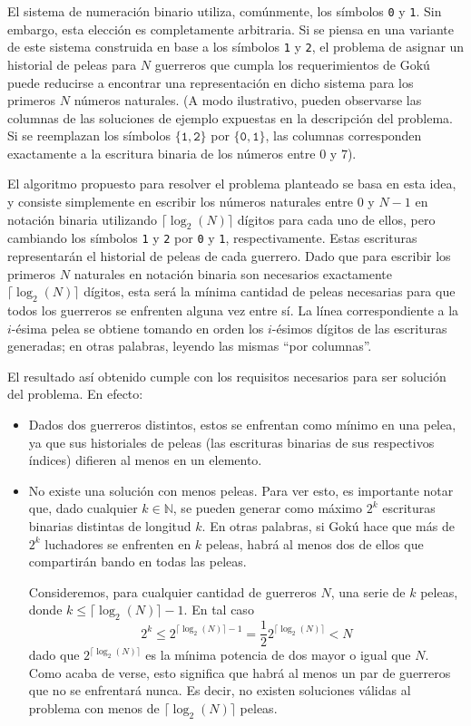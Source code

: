         El sistema de numeración binario utiliza, comúnmente, los símbolos \texttt{0} y \texttt{1}. Sin embargo, esta elección es completamente arbitraria. Si se piensa en una variante de este sistema construida en base a los símbolos \texttt{1} y \texttt{2}, el problema de asignar un historial de peleas para $N$ guerreros que cumpla los requerimientos de Gokú puede reducirse a encontrar una representación en dicho sistema para los primeros $N$ números naturales. (A modo ilustrativo, pueden observarse las columnas de las soluciones de ejemplo expuestas en la descripción del problema. Si se reemplazan los símbolos $\lbrace\mathtt{1},\mathtt{2}\rbrace$ por $\lbrace\mathtt{0},\mathtt{1}\rbrace$, las columnas corresponden exactamente a la escritura binaria de los números entre $0$ y $7$).

        El algoritmo propuesto para resolver el problema planteado se basa en esta idea, y consiste simplemente en escribir los números naturales entre $0$ y $N-1$ en notación binaria utilizando $\lceil \log_2(N) \rceil$ dígitos para cada uno de ellos, pero cambiando los símbolos \texttt{1} y \texttt{2} por \texttt{0} y \texttt{1}, respectivamente. Estas escrituras representarán el historial de peleas de cada guerrero. Dado que para escribir los primeros $N$ naturales en notación binaria son necesarios exactamente $\lceil\log_2(N)\rceil$ dígitos, esta será la mínima cantidad de peleas necesarias para que todos los guerreros se enfrenten alguna vez entre sí. La línea correspondiente a la $i$-ésima pelea se obtiene tomando en orden los $i$-ésimos dígitos de las escrituras generadas; en otras palabras, leyendo las mismas ``por columnas''.

        El resultado así obtenido cumple con los requisitos necesarios para ser solución del problema. En efecto:
        \begin{itemize}
            \item Dados dos guerreros distintos, estos se enfrentan como mínimo en una pelea, ya que sus historiales de peleas (las escrituras binarias de sus respectivos índices) difieren al menos en un elemento.

            \item No existe una solución con menos peleas. Para ver esto, es importante notar que, dado cualquier $k \in \mathbb{N}$, se pueden generar como máximo $2^k$ escrituras binarias distintas de longitud $k$. En otras palabras, si Gokú hace que más de $2^k$ luchadores se enfrenten en $k$ peleas, habrá al menos dos de ellos que compartirán bando en todas las peleas.

            Consideremos, para cualquier cantidad de guerreros $N$, una serie de $k$ peleas, donde $k \leq \lceil \log_2(N) \rceil - 1$. En tal caso
            \[ 2^k \leq 2^{\lceil \log_2(N) \rceil - 1} = \frac{1}{2} 2^{\lceil \log_2(N) \rceil} < N\]
            dado que $ 2^{\lceil \log_2(N) \rceil}$ es la mínima potencia de dos mayor o igual que $N$. Como acaba de verse, esto significa que habrá al menos un par de guerreros que no se enfrentará nunca. Es decir, no existen soluciones válidas al problema con menos de $\lceil \log_2(N) \rceil$ peleas.
        \end{itemize}

